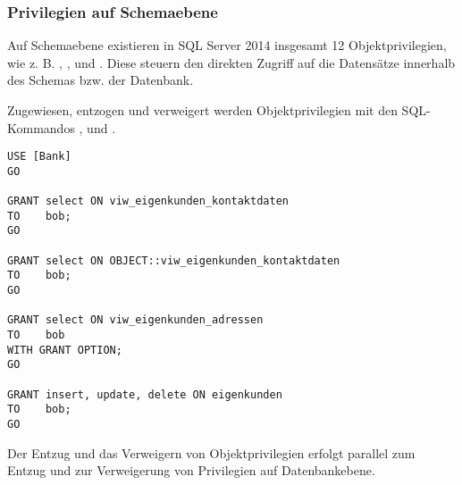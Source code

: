         \subsubsection{Privilegien auf Schemaebene}
          Auf Schemaebene existieren in SQL Server 2014 insgesamt 12
          Objektprivilegien, wie z. B. , ,
           und . Diese steuern den direkten
          Zugriff auf die Datensätze innerhalb des Schemas bzw. der Datenbank.
        
          Zugewiesen, entzogen und verweigert werden Objektprivilegien mit den
          SQL-Kommandos ,  und
          .
          \begin{lstlisting}[language=ms_sql,caption={Erteilen
          von Objektprivilegien},label=sql19_12a]
USE [Bank]
GO

GRANT select ON viw_eigenkunden_kontaktdaten
TO    bob;
GO

GRANT select ON OBJECT::viw_eigenkunden_kontaktdaten
TO    bob;
GO

GRANT select ON viw_eigenkunden_adressen
TO    bob
WITH GRANT OPTION;
GO        

GRANT insert, update, delete ON eigenkunden
TO    bob;
GO  
          \end{lstlisting}
          Der Entzug und das Verweigern von Objektprivilegien erfolgt parallel
          zum Entzug und zur Verweigerung von Privilegien auf Datenbankebene.
          \begin{literaturinternet}
            \item \cite{ms188371}
            \item \cite{ms187965}
          \end{literaturinternet}
